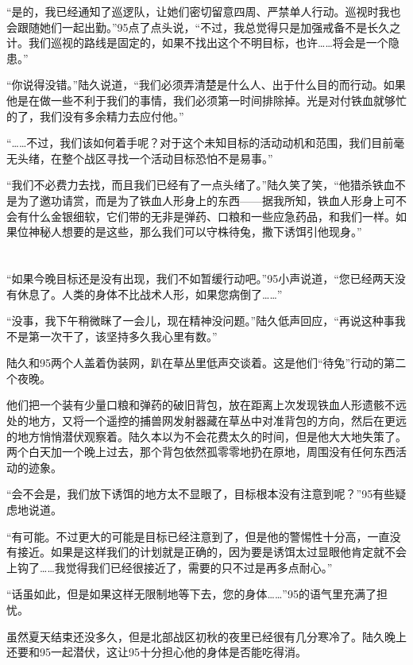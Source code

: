 “是的，我已经通知了巡逻队，让她们密切留意四周、严禁单人行动。巡视时我也会跟随她们一起出勤。”95点了点头说，“不过，我总觉得只是加强戒备不是长久之计。我们巡视的路线是固定的，如果不找出这个不明目标，也许……将会是一个隐患。”

“你说得没错。”陆久说道，“我们必须弄清楚是什么人、出于什么目的而行动。如果他是在做一些不利于我们的事情，我们必须第一时间排除掉。光是对付铁血就够忙的了，我们没有多余精力去应付他。”

“……不过，我们该如何着手呢？对于这个未知目标的活动动机和范围，我们目前毫无头绪，在整个战区寻找一个活动目标恐怕不是易事。”

“我们不必费力去找，而且我们已经有了一点头绪了。”陆久笑了笑，“他猎杀铁血不是为了邀功请赏，而是为了铁血人形身上的东西——据我所知，铁血人形身上可不会有什么金银细软，它们带的无非是弹药、口粮和一些应急药品，和我们一样。如果位神秘人想要的是这些，那么我们可以守株待兔，撒下诱饵引他现身。”

\section*{}

“如果今晚目标还是没有出现，我们不如暂缓行动吧。”95小声说道，“您已经两天没有休息了。人类的身体不比战术人形，如果您病倒了……”

“没事，我下午稍微眯了一会儿，现在精神没问题。”陆久低声回应，“再说这种事我不是第一次干了，该坚持多久我心里有数。”

陆久和95两个人盖着伪装网，趴在草丛里低声交谈着。这是他们“待兔”行动的第二个夜晚。

他们把一个装有少量口粮和弹药的破旧背包，放在距离上次发现铁血人形遗骸不远处的地方，又将一个遥控的捕兽网发射器藏在草丛中对准背包的方向，然后在更远的地方悄悄潜伏观察着。陆久本以为不会花费太久的时间，但是他大大地失策了。两个白天加一个晚上过去，那个背包依然孤零零地扔在原地，周围没有任何东西活动的迹象。

“会不会是，我们放下诱饵的地方太不显眼了，目标根本没有注意到呢？”95有些疑虑地说道。

“有可能。不过更大的可能是目标已经注意到了，但是他的警惕性十分高，一直没有接近。如果是这样我们的计划就是正确的，因为要是诱饵太过显眼他肯定就不会上钩了……我觉得我们已经很接近了，需要的只不过是再多点耐心。”

“话虽如此，但是如果这样无限制地等下去，您的身体……”95的语气里充满了担忧。

虽然夏天结束还没多久，但是北部战区初秋的夜里已经很有几分寒冷了。陆久晚上还要和95一起潜伏，这让95十分担心他的身体是否能吃得消。

